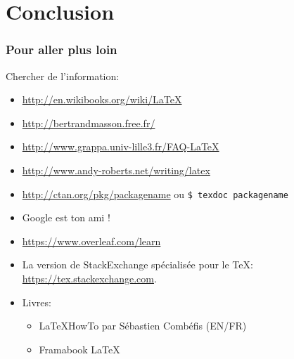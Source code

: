 \section{Conclusion}

\begin{frame}
  \frametitle{Pour aller plus loin}
  Chercher de l'information:
    \begin{itemize}
        \item \url{http://en.wikibooks.org/wiki/LaTeX}
        \item \url{http://bertrandmasson.free.fr/}
        \item \url{http://www.grappa.univ-lille3.fr/FAQ-LaTeX}
            \item \url{http://www.andy-roberts.net/writing/latex}
            \item \url{http://ctan.org/pkg/packagename} ou \lstinline[language=sh,morekeywords={texdoc}]{$ texdoc packagename}
        \item Google est ton ami !
            \item \url{https://www.overleaf.com/learn}
            \item La version de StackExchange spécialisée pour le \TeX:
  \url{https://tex.stackexchange.com}.
        \item Livres:
        \begin{itemize}
            \item \LaTeX HowTo par Sébastien Combéfis (EN/FR)
            \item Framabook \LaTeX
        \end{itemize}
    \end{itemize}
\end{frame}
